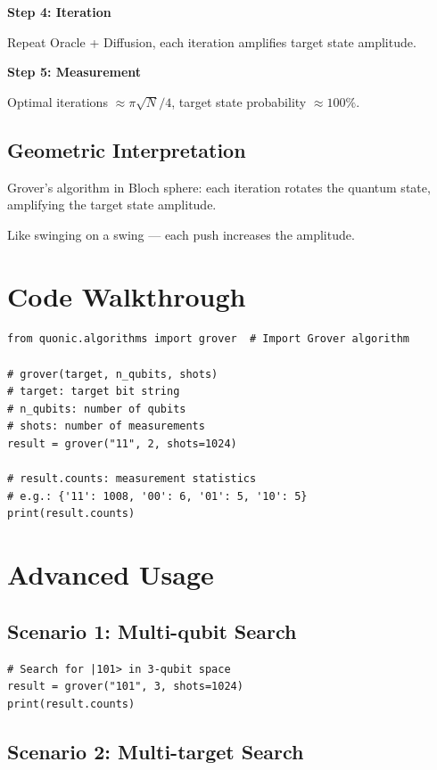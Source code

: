 \documentclass[12pt,a4paper]{article}
\begin{document}
\textbf{Step 4: Iteration}

Repeat Oracle + Diffusion, each iteration amplifies target state amplitude.

\textbf{Step 5: Measurement}

Optimal iterations $\approx \pi\sqrt{N}/4$, target state probability $\approx 100\%$.

\subsection{Geometric Interpretation}

Grover's algorithm in Bloch sphere: each iteration rotates the quantum state, amplifying the target state amplitude.

Like swinging on a swing — each push increases the amplitude.

\section{Code Walkthrough}

\begin{verbatim}
from quonic.algorithms import grover  # Import Grover algorithm

# grover(target, n_qubits, shots)
# target: target bit string
# n_qubits: number of qubits
# shots: number of measurements
result = grover("11", 2, shots=1024)

# result.counts: measurement statistics
# e.g.: {'11': 1008, '00': 6, '01': 5, '10': 5}
print(result.counts)
\end{verbatim}

\section{Advanced Usage}

\subsection{Scenario 1: Multi-qubit Search}

\begin{verbatim}
# Search for |101> in 3-qubit space
result = grover("101", 3, shots=1024)
print(result.counts)
\end{verbatim}

\subsection{Scenario 2: Multi-target Search}
\end{document}
